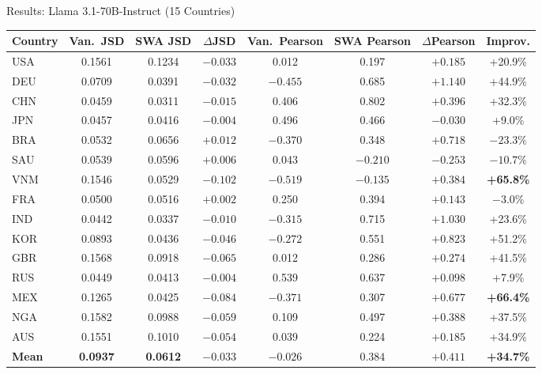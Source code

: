 \documentclass[11pt, aspectratio=169]{beamer}
\begin{document}
\begin{frame}{Results: Llama 3.1-70B-Instruct (15 Countries)}

\begin{table}
\centering
\scriptsize
\renewcommand{\arraystretch}{1.05}
\begin{tabular}{@{}l cc c cc c c@{}}
\toprule
\textbf{Country} & \textbf{Van.\ JSD} & \textbf{SWA JSD} & \textbf{$\Delta$JSD} & \textbf{Van.\ Pearson} & \textbf{SWA Pearson} & \textbf{$\Delta$Pearson} & \textbf{Improv.} \\
\midrule
USA & 0.1561 & 0.1234 & $-0.033$ & 0.012 & 0.197 & $+0.185$ & \textcolor{cbGreen}{+20.9\%} \\
DEU & 0.0709 & 0.0391 & $-0.032$ & $-0.455$ & 0.685 & $+1.140$ & \textcolor{cbGreen}{+44.9\%} \\
CHN & 0.0459 & 0.0311 & $-0.015$ & 0.406 & 0.802 & $+0.396$ & \textcolor{cbGreen}{+32.3\%} \\
JPN & 0.0457 & 0.0416 & $-0.004$ & 0.496 & 0.466 & $-0.030$ & \textcolor{cbGreen}{+9.0\%} \\
BRA & 0.0532 & 0.0656 & \textcolor{alertred}{$+0.012$} & $-0.370$ & 0.348 & $+0.718$ & \textcolor{alertred}{$-23.3\%$} \\
SAU & 0.0539 & 0.0596 & \textcolor{alertred}{$+0.006$} & 0.043 & $-0.210$ & $-0.253$ & \textcolor{alertred}{$-10.7\%$} \\
\rowcolor{lightgray}
VNM & 0.1546 & 0.0529 & $-0.102$ & $-0.519$ & $-0.135$ & $+0.384$ & \textcolor{cbGreen}{\textbf{+65.8\%}} \\
FRA & 0.0500 & 0.0516 & \textcolor{alertred}{$+0.002$} & 0.250 & 0.394 & $+0.143$ & \textcolor{alertred}{$-3.0\%$} \\
IND & 0.0442 & 0.0337 & $-0.010$ & $-0.315$ & 0.715 & $+1.030$ & \textcolor{cbGreen}{+23.6\%} \\
KOR & 0.0893 & 0.0436 & $-0.046$ & $-0.272$ & 0.551 & $+0.823$ & \textcolor{cbGreen}{+51.2\%} \\
GBR & 0.1568 & 0.0918 & $-0.065$ & 0.012 & 0.286 & $+0.274$ & \textcolor{cbGreen}{+41.5\%} \\
RUS & 0.0449 & 0.0413 & $-0.004$ & 0.539 & 0.637 & $+0.098$ & \textcolor{cbGreen}{+7.9\%} \\
\rowcolor{lightgray}
MEX & 0.1265 & 0.0425 & $-0.084$ & $-0.371$ & 0.307 & $+0.677$ & \textcolor{cbGreen}{\textbf{+66.4\%}} \\
NGA & 0.1582 & 0.0988 & $-0.059$ & 0.109 & 0.497 & $+0.388$ & \textcolor{cbGreen}{+37.5\%} \\
AUS & 0.1551 & 0.1010 & $-0.054$ & 0.039 & 0.224 & $+0.185$ & \textcolor{cbGreen}{+34.9\%} \\
\midrule
\textbf{Mean} & \textbf{0.0937} & \textbf{0.0612} & $\mathbf{-0.033}$ & $\mathbf{-0.026}$ & $\mathbf{0.384}$ & $\mathbf{+0.411}$ & \textcolor{cbGreen}{\textbf{+34.7\%}} \\
\bottomrule
\end{tabular}
\end{table}

\end{frame}
\end{document}
